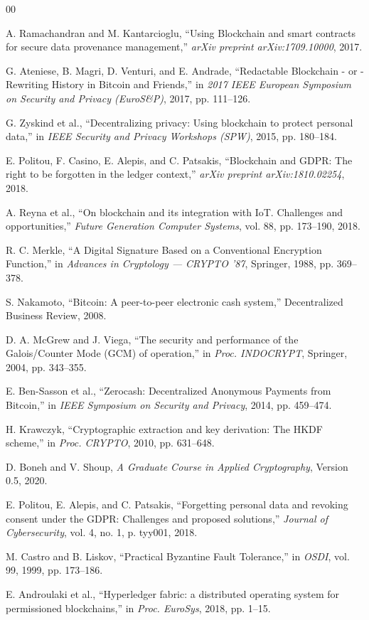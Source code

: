 \documentclass[conference]{IEEEtran}
\begin{document}
\begin{thebibliography}{00}

 A. Ramachandran and M. Kantarcioglu, ``Using Blockchain and smart contracts for secure data provenance management,'' \textit{arXiv preprint arXiv:1709.10000}, 2017.

 G. Ateniese, B. Magri, D. Venturi, and E. Andrade, ``Redactable Blockchain - or - Rewriting History in Bitcoin and Friends,'' in \textit{2017 IEEE European Symposium on Security and Privacy (EuroS\&P)}, 2017, pp. 111--126.

 G. Zyskind et al., ``Decentralizing privacy: Using blockchain to protect personal data,'' in \textit{IEEE Security and Privacy Workshops (SPW)}, 2015, pp. 180--184.

 E. Politou, F. Casino, E. Alepis, and C. Patsakis, ``Blockchain and GDPR: The right to be forgotten in the ledger context,'' \textit{arXiv preprint arXiv:1810.02254}, 2018.

 A. Reyna et al., ``On blockchain and its integration with IoT. Challenges and opportunities,'' \textit{Future Generation Computer Systems}, vol. 88, pp. 173--190, 2018.

 R. C. Merkle, ``A Digital Signature Based on a Conventional Encryption Function,'' in \textit{Advances in Cryptology --- CRYPTO '87}, Springer, 1988, pp. 369--378.

 S. Nakamoto, ``Bitcoin: A peer-to-peer electronic cash system,'' Decentralized Business Review, 2008.

 D. A. McGrew and J. Viega, ``The security and performance of the Galois/Counter Mode (GCM) of operation,'' in \textit{Proc. INDOCRYPT}, Springer, 2004, pp. 343--355.

 E. Ben-Sasson et al., ``Zerocash: Decentralized Anonymous Payments from Bitcoin,'' in \textit{IEEE Symposium on Security and Privacy}, 2014, pp. 459--474.


 H. Krawczyk, ``Cryptographic extraction and key derivation: The HKDF scheme,'' in \textit{Proc. CRYPTO}, 2010, pp. 631--648.

 D. Boneh and V. Shoup, \textit{A Graduate Course in Applied Cryptography}, Version 0.5, 2020.

 E. Politou, E. Alepis, and C. Patsakis, ``Forgetting personal data and revoking consent under the GDPR: Challenges and proposed solutions,'' \textit{Journal of Cybersecurity}, vol. 4, no. 1, p. tyy001, 2018.

 M. Castro and B. Liskov, ``Practical Byzantine Fault Tolerance,'' in \textit{OSDI}, vol. 99, 1999, pp. 173--186.

 E. Androulaki et al., ``Hyperledger fabric: a distributed operating system for permissioned blockchains,'' in \textit{Proc. EuroSys}, 2018, pp. 1--15.


\end{thebibliography}
\end{document}
